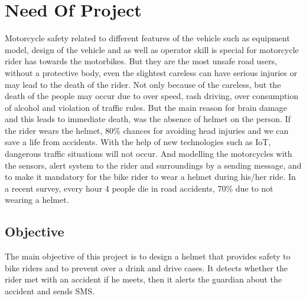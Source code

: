 \section{Need Of Project}
Motorcycle safety related to different features of the vehicle such as equipment model, design of the vehicle and as well as operator skill is special for motorcycle rider has towards the motorbikes. But they are the most unsafe road users, without a protective body, even the slightest careless can have serious injuries or may lead to the death of the rider. Not only because of the careless, but the death of the people may occur due to over speed, rash driving, over consumption of alcohol and violation of traffic rules. But the main reason for brain damage and this leads to immediate death, was the absence of helmet on the person. If the rider wears the helmet, 80\% chances for avoiding head injuries and we can save a life from accidents. With the help of new technologies such as IoT, dangerous traffic situations will not occur. And modelling the motorcycles with the sensors, alert system to the rider and surroundings by a sending message, and to make it mandatory for the bike rider to wear a helmet during his/her ride. In a recent survey, every hour 4 people die in road accidents, 70\% due to not wearing a helmet.

\begin{center}
	\section*{Objective}
\end{center}
The main objective of this project is to design a helmet that provides safety to bike riders and to prevent over a drink and drive cases. It detects whether the rider met with an accident if he meets, then it alerts the guardian about the accident and sends SMS.